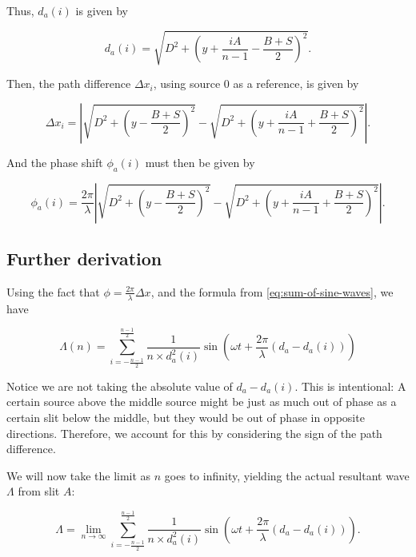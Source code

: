 \documentclass{paper}
\begin{document}
Thus, $d_a(i)$ is given by

\begin{equation}
    \label{eq:d_a(i)}
    d_a(i) = \sqrt{D^2 + \left(y + \frac{iA}{n - 1} - \frac{B + S}{2}\right)^2}.
\end{equation}

Then, the path difference $\Delta{x}_i$, using source $0$ as a reference, is given by

\begin{equation*}
    \Delta{x}_i = \left\lvert \sqrt{D^2 + \left(y - \frac{B + S}{2}\right)^2} - \sqrt{D^2 + \left(y + \frac{iA}{n - 1} + \frac{B + S}{2}\right)^2} \right\rvert.
\end{equation*}

And the phase shift $\phi_a(i)$ must then be given by

\begin{equation}
    \label{eq:phi_a(i)}
    \phi_a(i) = \frac{2\pi}{\lambda}\left\lvert \sqrt{D^2 + \left(y - \frac{B + S}{2}\right)^2} - \sqrt{D^2 + \left(y + \frac{iA}{n - 1} + \frac{B + S}{2}\right)^2} \right\rvert.
\end{equation}

\subsection{Further derivation}

Using the fact that $\phi = \frac{2\pi}{\lambda}\Delta{x}$, and the formula from \eqref{eq:sum-of-sine-waves}, we have

\begin{equation*}
    \Lambda(n) = \sum_{i = -\frac{n - 1}{2}}^{\frac{n - 1}{2}} \frac{1}{n \times d_a^2(i)} \sin\left(\omega t + \frac{2\pi}{\lambda}(d_a - d_a(i))\right)
\end{equation*}

Notice we are not taking the absolute value of $d_a - d_a(i)$. This is intentional: A certain source above the middle source might be just as much out of phase as a certain slit below the middle, but they would be out of phase in opposite directions. Therefore, we account for this by considering the sign of the path difference.

We will now take the limit as $n$ goes to infinity, yielding the actual resultant wave $\Lambda$ from slit $A$:

\begin{equation*}
    \Lambda = \lim_{n \to \infty} \sum_{i = -\frac{n - 1}{2}}^{\frac{n - 1}{2}} \frac{1}{n \times d_a^2(i)} \sin\left(\omega t + \frac{2\pi}{\lambda}(d_a - d_a(i))\right).
\end{equation*}
\end{document}
